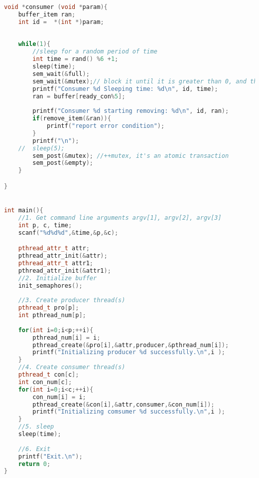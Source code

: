 \documentclass[12pt,a4paper]{article}
\begin{document}
\begin{lstlisting}[language=C++]
void *consumer (void *param){
	buffer_item ran;
	int id =  *(int *)param;
	
	
	while(1){
		//sleep for a random period of time 
		int time = rand() %6 +1;
		sleep(time);
		sem_wait(&full);
		sem_wait(&mutex);// block it until it is greater than 0, and then --mutex 
		printf("Consumer %d Sleeping time: %d\n", id, time);
		ran = buffer[ready_con%5];
		
		printf("Consumer %d starting removing: %d\n", id, ran);
		if(remove_item(&ran)){
			printf("report error condition");
		}
		printf("\n");
	//	sleep(5);
		sem_post(&mutex); //++mutex, it's an atomic transaction
		sem_post(&empty);
	}

}


int main(){
	//1. Get command line arguments argv[1], argv[2], argv[3]
	int p, c, time;
	scanf("%d%d%d",&time,&p,&c);

	pthread_attr_t attr;
	pthread_attr_init(&attr);
	pthread_attr_t attr1;
	pthread_attr_init(&attr1);
	//2. Initialize buffer	
	init_semaphores();
	
	//3. Create producer thread(s)
	pthread_t pro[p];
	int pthread_num[p];
	
	for(int i=0;i<p;++i){
		pthread_num[i] = i;
		pthread_create(&pro[i],&attr,producer,&pthread_num[i]);
		printf("Initializing producer %d successfully.\n",i );
	}
	//4. Create consumer thread(s)
	pthread_t con[c];
	int con_num[c];
	for(int i=0;i<c;++i){
		con_num[i] = i;
		pthread_create(&con[i],&attr,consumer,&con_num[i]);
		printf("Initializing comsumer %d successfully.\n",i );
	}	
	//5. sleep
	sleep(time);
	
	//6. Exit
	printf("Exit.\n");	
	return 0;
}

\end{lstlisting}




\end{document}
